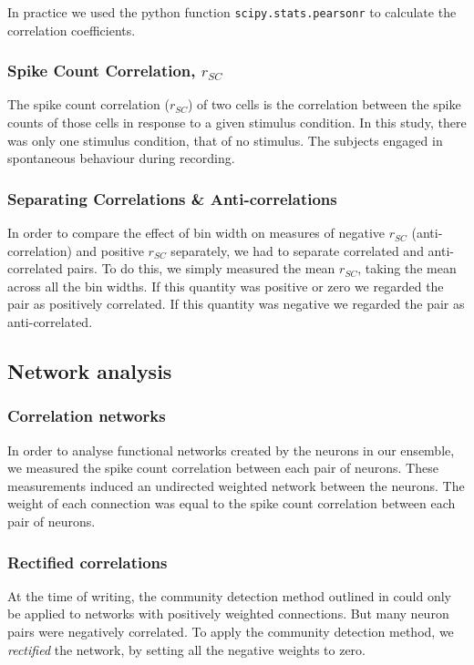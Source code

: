 \documentclass[a4paper,12pt]{article}
\theoremstyle{definition}
\begin{document}
    In practice we used the python function \texttt{scipy.stats.pearsonr} to calculate the correlation coefficients.

        \subsubsection{Spike Count Correlation, $r_{SC}$}\label{sec:spike_count_correlation}
        The spike count correlation ($r_{SC}$) of two cells is the correlation between the spike counts of those cells in response to a given stimulus condition. In this study, there was only one stimulus condition, that of no stimulus. The subjects engaged in spontaneous behaviour during recording.


        \subsubsection{Separating Correlations \& Anti-correlations}\label{sec:corr_anti_corr} 
        In order to compare the effect of bin width on measures of negative $r_{SC}$ (anti-correlation) and positive $r_{SC}$ separately, we had to separate correlated and anti-correlated pairs. To do this, we simply measured the mean $r_{SC}$, taking the mean across all the bin widths. If this quantity was positive or zero we regarded the pair as positively correlated. If this quantity was negative we regarded the pair as anti-correlated.

    \subsection{Network analysis}
        \subsubsection{Correlation networks}
        In order to analyse functional networks created by the neurons in our ensemble, we measured the spike count correlation between each pair of neurons. These measurements induced an undirected weighted network between the neurons. The weight of each connection was equal to the spike count correlation between each pair of neurons. 

        \subsubsection{Rectified correlations}
        At the time of writing, the community detection method outlined in \cite{Humphries} could only be applied to networks with positively weighted connections. But many neuron pairs were negatively correlated. To apply the community detection method, we \textit{rectified} the network, by setting all the negative weights to zero.
\end{document}
